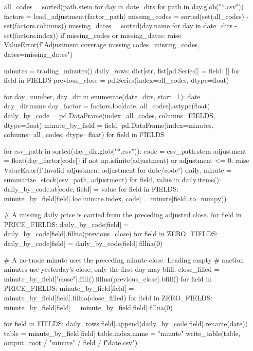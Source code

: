 \documentclass[UTF8,a4paper,fontset=fandol]{ctexart}
\begin{document}
\begin{ProjectCode}
    all_codes = sorted({path.stem for day in date_dirs for path in day.glob("*.csv")})
    factors = load_adjustment(factor_path)
    missing_codes = sorted(set(all_codes) - set(factors.columns))
    missing_dates = sorted({day.name for day in date_dirs} - set(factors.index))
    if missing_codes or missing_dates:
        raise ValueError(f"Adjustment coverage missing codes={missing_codes}, dates={missing_dates}")

    minutes = trading_minutes()
    daily_rows: dict[str, list[pd.Series]] = {field: [] for field in FIELDS}
    previous_close = pd.Series(index=all_codes, dtype=float)

    for day_number, day_dir in enumerate(date_dirs, start=1):
        date = day_dir.name
        day_factor = factors.loc[date, all_codes].astype(float)
        daily_by_code = pd.DataFrame(index=all_codes, columns=FIELDS, dtype=float)
        minute_by_field = {
            field: pd.DataFrame(index=minutes, columns=all_codes, dtype=float)
            for field in FIELDS
        }

        for csv_path in sorted(day_dir.glob("*.csv")):
            code = csv_path.stem
            adjustment = float(day_factor[code])
            if not np.isfinite(adjustment) or adjustment <= 0:
                raise ValueError(f"Invalid adjustment {adjustment} for {date}/{code}")
            daily, minute = summarize_stock(csv_path, adjustment)
            for field, value in daily.items():
                daily_by_code.at[code, field] = value
            for field in FIELDS:
                minute_by_field[field].loc[minute.index, code] = minute[field].to_numpy()

        # A missing daily price is carried from the preceding adjusted close.
        for field in PRICE_FIELDS:
            daily_by_code[field] = daily_by_code[field].fillna(previous_close)
        for field in ZERO_FIELDS:
            daily_by_code[field] = daily_by_code[field].fillna(0)

        # A no-trade minute uses the preceding minute close. Leading empty
        # auction minutes use yesterday's close; only the first day may bfill.
        close_filled = minute_by_field["close"].ffill().fillna(previous_close).bfill()
        for field in PRICE_FIELDS:
            minute_by_field[field] = minute_by_field[field].fillna(close_filled)
        for field in ZERO_FIELDS:
            minute_by_field[field] = minute_by_field[field].fillna(0)

        for field in FIELDS:
            daily_rows[field].append(daily_by_code[field].rename(date))
            table = minute_by_field[field]
            table.index.name = "minute"
            write_table(table, output_root / "minute" / field / f"{date}.csv")


\end{ProjectCode}
\end{document}
